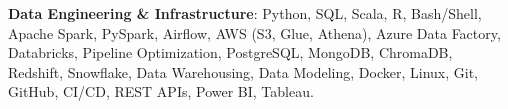 \item \textbf{Data Engineering \& Infrastructure}: Python, SQL, Scala, R, Bash/Shell, Apache Spark, PySpark, Airflow, AWS (S3, Glue, Athena), Azure Data Factory, Databricks, Pipeline Optimization, PostgreSQL, MongoDB, ChromaDB, Redshift, Snowflake, Data Warehousing, Data Modeling, Docker, Linux, Git, GitHub, CI/CD, REST APIs, Power BI, Tableau.


